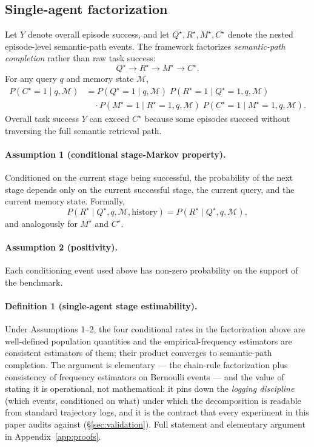 \documentclass{article}
\begin{document}
\subsection{Single-agent factorization}
\label{sec:single-theory}

Let $Y$ denote overall episode success, and let
$Q^\star, R^\star, M^\star, C^\star$ denote the nested episode-level
semantic-path events. The framework factorizes \emph{semantic-path
completion} rather than raw task success:
\[
Q^\star \rightarrow R^\star \rightarrow M^\star \rightarrow C^\star.
\]
For any query $q$ and memory state $\mathcal{M}$,
\begin{align*}
P(C^\star = 1 \mid q, \mathcal{M})
&=
P(Q^\star = 1 \mid q, \mathcal{M})\;
P(R^\star = 1 \mid Q^\star = 1, q, \mathcal{M}) \\
&\quad \cdot
P(M^\star = 1 \mid R^\star = 1, q, \mathcal{M})\;
P(C^\star = 1 \mid M^\star = 1, q, \mathcal{M}).
\end{align*}
Overall task success $Y$ can exceed $C^\star$ because some episodes
succeed without traversing the full semantic retrieval path.

\paragraph{Assumption 1 (conditional stage-Markov property).}
Conditioned on the current stage being successful, the probability of
the next stage depends only on the current successful stage, the
current query, and the current memory state. Formally,
\[
P(R^\star \mid Q^\star, q, \mathcal{M}, \text{history}) = P(R^\star \mid Q^\star, q, \mathcal{M}),
\]
and analogously for $M^\star$ and $C^\star$.

\paragraph{Assumption 2 (positivity).}
Each conditioning event used above has non-zero probability on the
support of the benchmark.

\paragraph{Definition 1 (single-agent stage estimability).}
Under Assumptions 1--2, the four conditional rates in the factorization above are well-defined population quantities and the empirical-frequency estimators are consistent estimators of them; their product converges to semantic-path completion. The argument is elementary --- the chain-rule factorization plus consistency of frequency estimators on Bernoulli events --- and the value of stating it is operational, not mathematical: it pins down the \emph{logging discipline} (which events, conditioned on what) under which the decomposition is readable from standard trajectory logs, and it is the contract that every experiment in this paper audits against (\S\ref{sec:validation}). Full statement and elementary argument in Appendix~\ref{app:proofs}.
\end{document}
